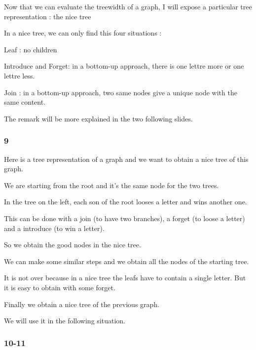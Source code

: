 \documentclass[a4paper, 10pt,french,landscape]{article}
\begin{document}
\begin{multicols}{3}
Now that we can evaluate the treewidth of a graph, I will expose a particular tree representation : the nice  tree

In a nice tree, we can only find this four situations : 

Leaf : no children

Introduce and Forget: in a bottom-up approach, there is one lettre more or one lettre less.

Join : in a bottom-up approach, two same nodes give a unique node with the same content.

The remark will be more explained in the two following slides. 



\subsubsection*{ 9}

Here is a tree representation of a graph and we want to obtain a nice tree of this graph.


We are starting from the root and it's the same node for the two trees.

In the tree on the left, each son of the root looses a letter and wins another one.

 This can be done with a join (to have two branches), a forget (to loose a letter) and a introduce (to win a letter). 
 
 So we obtain the good nodes in the nice tree.

We can make some similar steps and we obtain all the nodes of the starting tree.

It is not over because in a nice tree the leafs have to contain a single letter. But it is easy  to obtain with some forget.

Finally we obtain a nice tree of the previous graph. 

We will use it in the following situation.



\subsubsection*{ 10-11}





\end{multicols}
\end{document}
